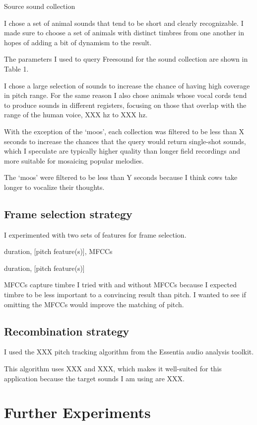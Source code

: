 \documentclass{article}
\begin{document}
Source sound collection

I chose a set of animal sounds that tend to be short and clearly recognizable. I made sure to choose a set of animals with distinct timbres from one another in hopes of adding a bit of dynamism to the result. 

The parameters I used to query Freesound for the sound collection are shown in Table 1.



I chose a large selection of sounds to increase the chance of having high coverage in pitch range. For the same reason I also chose animals whose vocal cords tend to produce sounds in different registers, focusing on those that overlap with the range of the human voice, XXX hz to XXX hz.

With the exception of the ‘moos’, each collection was filtered to be less than X seconds to increase the chances that the query would return single-shot sounds, which I speculate are typically higher quality than longer field recordings and more suitable for mosaicing popular melodies.

The ‘moos’ were filtered to be less than Y seconds because I think cows take longer to vocalize their thoughts.

\subsection{Frame selection strategy}

I experimented with two sets of features for frame selection.

duration, [pitch feature(s)], MFCCs

duration, [pitch feature(s)]


MFCCs capture timbre 
I tried with and without MFCCs because I expected timbre to be less important to a convincing result than pitch. I wanted to see if omitting the MFCCs would improve the matching of pitch.

\subsection{Recombination strategy}

I used the XXX pitch tracking algorithm from the Essentia audio analysis toolkit.

This algorithm uses XXX and XXX, which makes it well-suited for this application because the target sounds I am using are XXX.


\section{Further Experiments}
\end{document}
